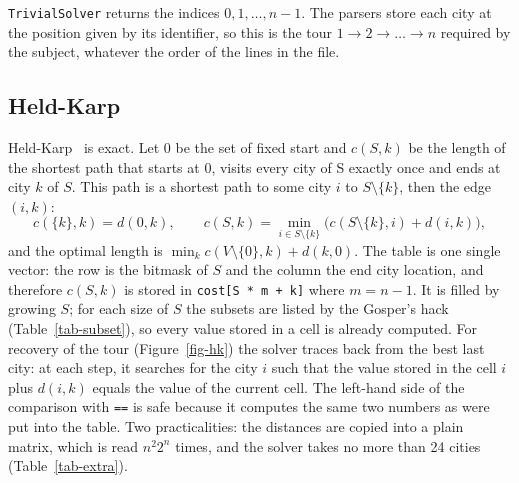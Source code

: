 \documentclass[10pt,a4paper]{article}
\begin{document}
\texttt{TrivialSolver} returns the indices $0, 1, \dots, n-1$. The parsers store each city at the position given by its identifier, so this is the tour $1 \rightarrow 2 \rightarrow \dots \rightarrow n$ required by the subject, whatever the order of the lines in the file.

\subsection{Held-Karp}\label{sec-hk}

Held-Karp~\cite{heldkarp} is exact. Let $0$ be the set of fixed start and $c(S, k)$ be the length of the shortest path that starts at 0, visits every city of S exactly once and ends at city $k$ of $S$. This path is a shortest path to some city $i$ to $S \setminus \{k\}$, then the edge $(i,k)$:
\[
c(\{k\},k) = d(0,k), \qquad c(S,k) = \min_{i \in S \setminus \{k\}} \big( c(S \setminus \{k\}, i) + d(i,k) \big),
\]
and the optimal length is $\min_k c(V \setminus \{0\}, k) + d(k,0)$. The table is one single vector: the row is the bitmask of $S$ and the column the end city location, and therefore $c(S,k)$ is stored in \texttt{cost[S * m + k]} where $m = n-1$. It is filled by growing $S$; for each size of $S$ the subsets are listed by the Gosper's hack (Table~\ref{tab-subset}), so every value stored in a cell is already computed. For recovery of the tour (Figure~\ref{fig-hk}) the solver traces back from the best last city: at each step, it searches for the city $i$ such that the value stored in the cell $i$ plus $d(i,k)$ equals the value of the current cell. The left-hand side of the comparison with \texttt{==} is safe because it computes the same two numbers as were put into the table. Two practicalities: the distances are copied into a plain matrix, which is read $n^2 2^n$ times, and the solver takes no more than 24 cities (Table~\ref{tab-extra}).
\end{document}
